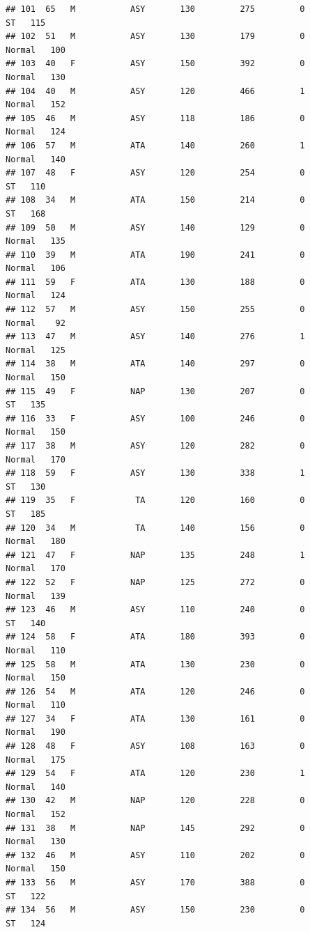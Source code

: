 \documentclass[
]{article}
\begin{document}
\begin{verbatim}
## 101  65   M           ASY       130         275         0         ST   115
## 102  51   M           ASY       130         179         0     Normal   100
## 103  40   F           ASY       150         392         0     Normal   130
## 104  40   M           ASY       120         466         1     Normal   152
## 105  46   M           ASY       118         186         0     Normal   124
## 106  57   M           ATA       140         260         1     Normal   140
## 107  48   F           ASY       120         254         0         ST   110
## 108  34   M           ATA       150         214         0         ST   168
## 109  50   M           ASY       140         129         0     Normal   135
## 110  39   M           ATA       190         241         0     Normal   106
## 111  59   F           ATA       130         188         0     Normal   124
## 112  57   M           ASY       150         255         0     Normal    92
## 113  47   M           ASY       140         276         1     Normal   125
## 114  38   M           ATA       140         297         0     Normal   150
## 115  49   F           NAP       130         207         0         ST   135
## 116  33   F           ASY       100         246         0     Normal   150
## 117  38   M           ASY       120         282         0     Normal   170
## 118  59   F           ASY       130         338         1         ST   130
## 119  35   F            TA       120         160         0         ST   185
## 120  34   M            TA       140         156         0     Normal   180
## 121  47   F           NAP       135         248         1     Normal   170
## 122  52   F           NAP       125         272         0     Normal   139
## 123  46   M           ASY       110         240         0         ST   140
## 124  58   F           ATA       180         393         0     Normal   110
## 125  58   M           ATA       130         230         0     Normal   150
## 126  54   M           ATA       120         246         0     Normal   110
## 127  34   F           ATA       130         161         0     Normal   190
## 128  48   F           ASY       108         163         0     Normal   175
## 129  54   F           ATA       120         230         1     Normal   140
## 130  42   M           NAP       120         228         0     Normal   152
## 131  38   M           NAP       145         292         0     Normal   130
## 132  46   M           ASY       110         202         0     Normal   150
## 133  56   M           ASY       170         388         0         ST   122
## 134  56   M           ASY       150         230         0         ST   124

\end{verbatim}
\end{document}
